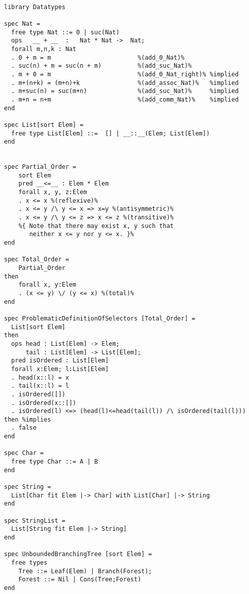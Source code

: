 \documentclass{article}
\begin{document}
\begin{lstlisting}

library Datatypes

spec Nat =
  free type Nat ::= 0 | suc(Nat)
  ops   __ + __  :   Nat * Nat ->  Nat;
  forall m,n,k : Nat
  . 0 + m = m                        %(add_0_Nat)%
  . suc(n) + m = suc(n + m)          %(add_suc_Nat)%
  . m + 0 = m                        %(add_0_Nat_right)% %implied
  . m+(n+k) = (m+n)+k                %(add_assoc_Nat)%   %implied
  . m+suc(n) = suc(m+n)              %(add_suc_Nat)%     %implied
  . m+n = n+m                        %(add_comm_Nat)%    %implied
end

spec List[sort Elem] =
  free type List[Elem] ::=  [] | __::__(Elem; List[Elem])
end


spec Partial_Order =
    sort Elem
    pred __<=__ : Elem * Elem
    forall x, y, z:Elem
    . x <= x %(reflexive)%
    . x <= y /\ y <= x => x=y %(antisymmetric)%
    . x <= y /\ y <= z => x <= z %(transitive)%
    %{ Note that there may exist x, y such that
       neither x <= y nor y <= x. }%
end

spec Total_Order =
    Partial_Order
then
    forall x, y:Elem
    . (x <= y) \/ (y <= x) %(total)%
end

spec ProblematicDefinitionOfSelectors [Total_Order] =
  List[sort Elem]
then
  ops head : List[Elem] -> Elem;
      tail : List[Elem] -> List[Elem];
  pred isOrdered : List[Elem]
  forall x:Elem; l:List[Elem]
  . head(x::l) = x
  . tail(x::l) = l
  . isOrdered([])
  . isOrdered(x::[])
  . isOrdered(l) <=> (head(l)<=head(tail(l)) /\ isOrdered(tail(l)))
then %implies
  . false
end

spec Char =
  free type Char ::= A | B
end

spec String =
  List[Char fit Elem |-> Char] with List[Char] |-> String
end

spec StringList =
  List[String fit Elem |-> String]
end

spec UnboundedBranchingTree [sort Elem] =
  free types 
    Tree ::= Leaf(Elem) | Branch(Forest);
    Forest ::= Nil | Cons(Tree;Forest)
end


\end{lstlisting}
\end{document}
